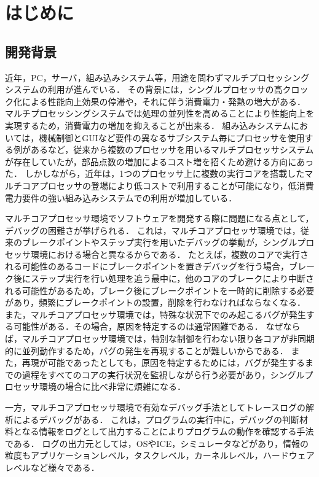 \chapter{はじめに}

\section{開発背景}

近年，PC，サーバ，組み込みシステム等，用途を問わずマルチプロセッシングシステムの利用が進んでいる．
その背景には，シングルプロセッサの高クロック化による性能向上効果の停滞や，それに伴う消費電力・発熱の増大がある．
マルチプロセッシングシステムでは処理の並列性を高めることにより性能向上を実現するため，消費電力の増加を抑えることが出来る．
組み込みシステムにおいては，機械制御とGUIなど要件の異なるサブシステム毎にプロセッサを使用する例があるなど，従来から複数のプロセッサを用いるマルチプロセッサシステムが存在していたが，部品点数の増加によるコスト増を招くため避ける方向にあった．
しかしながら，近年は，1つのプロセッサ上に複数の実行コアを搭載したマルチコアプロセッサの登場により低コストで利用することが可能になり，低消費電力要件の強い組み込みシステムでの利用が増加している．

マルチコアプロセッサ環境でソフトウェアを開発する際に問題になる点として，デバッグの困難さが挙げられる．
これは，マルチコアプロセッサ環境では，従来のブレークポイントやステップ実行を用いたデバッグの挙動が，シングルプロセッサ環境における場合と異なるからである．
たとえば，複数のコアで実行される可能性のあるコードにブレークポイントを置きデバッグを行う場合，ブレーク後にステップ実行を行い処理を追う最中に，他のコアのブレークにより中断される可能性があるため，ブレーク後にブレークポイントを一時的に削除する必要があり，頻繁にブレークポイントの設置，削除を行わなければならなくなる．
また，マルチコアプロセッサ環境では，特殊な状況下でのみ起こるバグが発生する可能性がある．その場合，原因を特定するのは通常困難である．
なぜならば，マルチコアプロセッサ環境では，特別な制御を行わない限り各コアが非同期的に並列動作するため，バグの発生を再現することが難しいからである．
また，再現が可能であったとしても，原因を特定するためには，バグが発生するまでの過程をすべてのコアの実行状況を監視しながら行う必要があり，シングルプロセッサ環境の場合に比べ非常に煩雑になる．

一方，マルチコアプロセッサ環境で有効なデバッグ手法としてトレースログの解析によるデバッグがある．
これは，プログラムの実行中に，デバッグの判断材料となる情報をログとして出力することによりプログラムの動作を確認する手法である．
ログの出力元としては，OSやICE，シミュレータなどがあり，情報の粒度もアプリケーションレベル，タスクレベル，カーネルレベル，ハードウェアレベルなど様々である．


